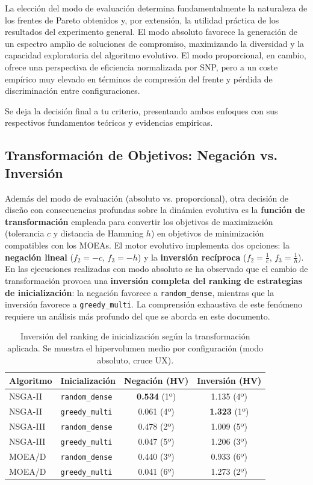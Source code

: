 \documentclass[a4paper,10pt]{article}
\begin{document}
La elección del modo de evaluación determina fundamentalmente la naturaleza de los frentes de Pareto obtenidos y, por extensión, la utilidad práctica de los resultados del experimento general. El modo absoluto favorece la generación de un espectro amplio de soluciones de compromiso, maximizando la diversidad y la capacidad exploratoria del algoritmo evolutivo. El modo proporcional, en cambio, ofrece una perspectiva de eficiencia normalizada por SNP, pero a un coste empírico muy elevado en términos de compresión del frente y pérdida de discriminación entre configuraciones.

Se deja la decisión final a tu criterio, presentando ambos enfoques con sus respectivos fundamentos teóricos y evidencias empíricas.

\subsection{Transformación de Objetivos: Negación vs. Inversión}

Además del modo de evaluación (absoluto vs. proporcional), otra decisión de diseño con consecuencias profundas sobre la dinámica evolutiva es la \textbf{función de transformación} empleada para convertir los objetivos de maximización (tolerancia $c$ y distancia de Hamming $h$) en objetivos de minimización compatibles con los MOEAs. El motor evolutivo implementa dos opciones: la \textbf{negación lineal} ($f_2 = -c$, $f_3 = -h$) y la \textbf{inversión recíproca} ($f_2 = \frac{1}{c}$, $f_3 = \frac{1}{h}$). En las ejecuciones realizadas con modo absoluto se ha observado que el cambio de transformación provoca una \textbf{inversión completa del ranking de estrategias de inicialización}: la negación favorece a \texttt{random\_dense}, mientras que la inversión favorece a \texttt{greedy\_multi}. La comprensión exhaustiva de este fenómeno requiere un análisis más profundo del que se aborda en este documento.

\begin{table}[H]
\centering
\caption{Inversión del ranking de inicialización según la transformación aplicada. Se muestra el hipervolumen medio por configuración (modo absoluto, cruce UX).}
\label{tab:neg_vs_inv}
\begin{tabular}{l l c c}
\toprule
\textbf{Algoritmo} & \textbf{Inicialización} & \textbf{Negación (HV)} & \textbf{Inversión (HV)} \\
\midrule
NSGA-II & \texttt{random\_dense}  & \textbf{0.534} (1º) & 1.135 (4º) \\
NSGA-II & \texttt{greedy\_multi}  & 0.061 (4º) & \textbf{1.323} (1º) \\
NSGA-III & \texttt{random\_dense} & 0.478 (2º) & 1.009 (5º) \\
NSGA-III & \texttt{greedy\_multi} & 0.047 (5º) & 1.206 (3º) \\
MOEA/D  & \texttt{random\_dense}  & 0.440 (3º) & 0.933 (6º) \\
MOEA/D  & \texttt{greedy\_multi}  & 0.041 (6º) & 1.273 (2º) \\
\bottomrule
\end{tabular}
\end{table}
\end{document}
